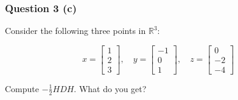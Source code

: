 \documentclass{article}
\begin{document}
\subsubsection*{Question 3 (c)}
\begin{flushleft}
    Consider the following three points in $\mathbb{R}^3$:

\[
x = \begin{bmatrix}1 \\ 2 \\ 3\end{bmatrix}, \quad
y = \begin{bmatrix}-1 \\ 0 \\ 1\end{bmatrix}, \quad
z = \begin{bmatrix}0 \\ -2 \\ -4\end{bmatrix}
\]

\end{flushleft}
\begin{flushleft}

Compute $-\frac{1}{2}HDH$. What do you get?
    
\end{flushleft}
\end{document}
